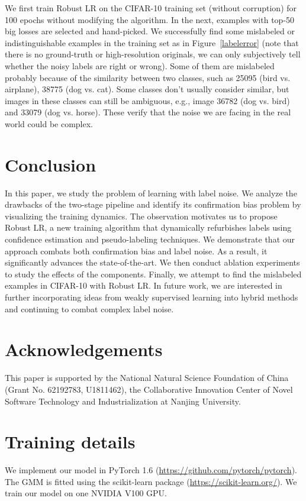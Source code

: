 \documentclass[letterpaper]{article} \usepackage{aaai23}  \usepackage{times}  \usepackage{helvet}  \usepackage{courier}  \usepackage[hyphens]{url}  \usepackage{graphicx} \urlstyle{rm} \def\UrlFont{\rm}  \usepackage{natbib}  \usepackage{caption} \frenchspacing  \setlength{\pdfpagewidth}{8.5in} \setlength{\pdfpageheight}{11in} \usepackage{algorithm}
\begin{document}
We first train Robust LR on the CIFAR-10 training set (without corruption) for 100 epochs without modifying the algorithm.
In the next, examples with top-50 big losses are selected and hand-picked.
We successfully find some mislabeled or indistinguishable examples in the training set as in Figure~\ref{labelerror} (note that there is no ground-truth or high-resolution originals, we can only subjectively tell whether the noisy labels are right or wrong).
Some of them are mislabeled probably because of the similarity between two classes, such as 25095 (bird vs. airplane), 38775 (dog vs. cat).
Some classes don't usually consider similar, but images in these classes can still be ambiguous, e.g., image 36782 (dog vs. bird) and 33079 (dog vs. horse).
These verify that the noise we are facing in the real world could be complex.

\section{Conclusion}
In this paper, we study the problem of learning with label noise. 
We analyze the drawbacks of the two-stage pipeline and identify its confirmation bias problem by visualizing the training dynamics.
The observation motivates us to propose Robust LR, a new training algorithm that dynamically refurbishes labels using confidence estimation and pseudo-labeling techniques.
We demonstrate that our approach combats both confirmation bias and label noise.
As a result, it significantly advances the state-of-the-art.
We then conduct ablation experiments to study the effects of the components.
Finally, we attempt to find the mislabeled examples in CIFAR-10 with Robust LR. 
In future work, we are interested in further incorporating ideas from weakly supervised learning into hybrid methods and continuing to combat complex label noise. 
\clearpage
\section{Acknowledgements}
This paper is supported by the National Natural Science Foundation of China (Grant No. 62192783, U1811462), the Collaborative Innovation Center of Novel Software Technology and Industrialization at Nanjing University.

\appendix
\clearpage
\appendix


\section{Training details}
We implement our model in PyTorch 1.6 (\url{https://github.com/pytorch/pytorch}).
The GMM is fitted using the scikit-learn package (\url{https://scikit-learn.org/}).
We train our model on one NVIDIA V100 GPU.
\end{document}
